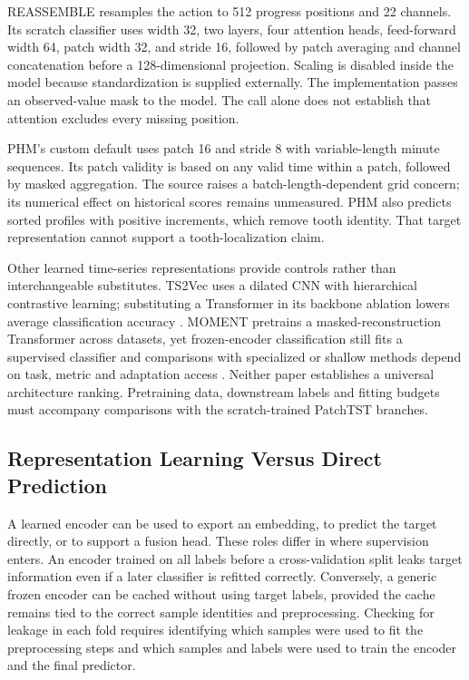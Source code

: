REASSEMBLE resamples the action to 512 progress positions and 22 channels. Its scratch classifier uses width 32, two layers, four attention heads, feed-forward width 64, patch width 32, and stride 16, followed by patch averaging and channel concatenation before a 128-dimensional projection. Scaling is disabled inside the model because standardization is supplied externally. The implementation passes an observed-value mask to the model. The call alone does not establish that attention excludes every missing position.

PHM's custom default uses patch 16 and stride 8 with variable-length minute sequences. Its patch validity is based on any valid time within a patch, followed by masked aggregation. The source raises a batch-length-dependent grid concern; its numerical effect on historical scores remains unmeasured. PHM also predicts sorted profiles with positive increments, which remove tooth identity. That target representation cannot support a tooth-localization claim.

Other learned time-series representations provide controls rather than interchangeable substitutes. TS2Vec uses a dilated CNN with hierarchical contrastive learning; substituting a Transformer in its backbone ablation lowers average classification accuracy \citep{P012}. MOMENT pretrains a masked-reconstruction Transformer across datasets, yet frozen-encoder classification still fits a supervised classifier and comparisons with specialized or shallow methods depend on task, metric and adaptation access \citep{P018}. Neither paper establishes a universal architecture ranking. Pretraining data, downstream labels and fitting budgets must accompany comparisons with the scratch-trained PatchTST branches.

\subsection{Representation Learning Versus Direct Prediction}
A learned encoder can be used to export an embedding, to predict the target directly, or to support a fusion head. These roles differ in where supervision enters. An encoder trained on all labels before a cross-validation split leaks target information even if a later classifier is refitted correctly. Conversely, a generic frozen encoder can be cached without using target labels, provided the cache remains tied to the correct sample identities and preprocessing. Checking for leakage in each fold requires identifying which samples were used to fit the preprocessing steps and which samples and labels were used to train the encoder and the final predictor.

